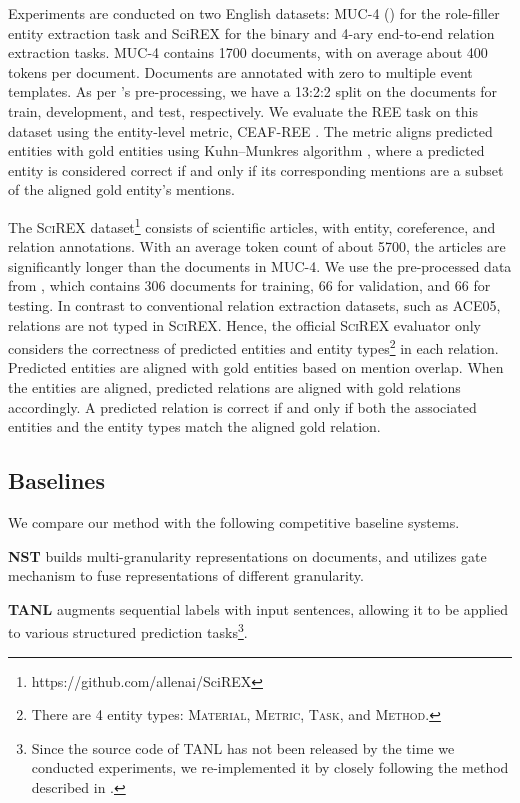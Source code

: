 \documentclass[11pt]{article}
\begin{document}
Experiments are conducted on two English datasets: MUC-4 (\citeyear{muc-1992-message}) for the role-filler entity extraction task and SciREX \cite{jain-etal-2020-scirex} for the binary and 4-ary end-to-end relation extraction tasks. MUC-4 contains 1700 documents, with on average about 400 tokens per document. Documents are annotated with zero to multiple event templates. As per \citet{du-2020-grit}'s pre-processing, we have a 13:2:2 split on the documents for train, development, and test, respectively. We evaluate the REE task on this dataset using the entity-level metric, CEAF-REE \cite{du-2020-grit}. The metric aligns predicted entities with gold entities using Kuhn–Munkres algorithm \cite{kuhn1955hungarian, munkres1957algorithms}, where a predicted entity is considered correct if and only if its corresponding mentions are a subset of the aligned gold entity's mentions.

The \textsc{SciREX} dataset\footnote{https://github.com/allenai/SciREX} consists of scientific articles, with entity, coreference, and relation annotations. With an average token count of about 5700, the articles are significantly longer than the documents in MUC-4. We use the pre-processed data from \citet{jain-etal-2020-scirex}, which contains 306 documents for training, 66 for validation, and 66 for testing. In contrast to conventional relation extraction datasets, such as ACE05, relations are not typed in \textsc{SciREX}.
Hence, the official \textsc{SciREX} evaluator \cite{jain-etal-2020-scirex} only considers the correctness of predicted entities and entity types\footnote{There are 4 entity types: \textsc{Material}, \textsc{Metric}, \textsc{Task}, and \textsc{Method}.} in each relation. Predicted entities are aligned with gold entities based on mention overlap. When the entities are aligned, predicted relations are aligned with gold relations accordingly. A predicted relation is correct if and only if both the associated entities and the entity types match the aligned gold relation.
\subsection{Baselines}
We compare our method with the following competitive baseline systems. 

\textbf{NST} \cite{du-cardie-2020-document} builds multi-granularity representations on documents, and utilizes gate mechanism to fuse representations of different granularity. 

\textbf{TANL} \cite{paolini2021structured} augments sequential labels with input sentences, allowing it to be applied to various structured prediction tasks\footnote{Since the source code of TANL has not been released by the time we conducted experiments, we re-implemented it by closely following the method described in \citet{paolini2021structured}.}. 
\end{document}
